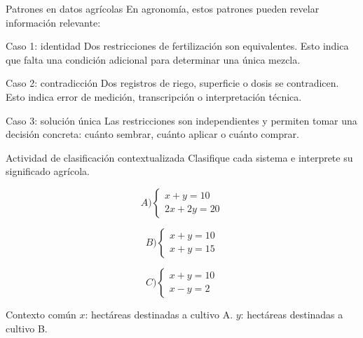 \documentclass[aspectratio=169]{beamer}
\begin{document}
\begin{frame}{Patrones en datos agrícolas}
	\small
	En agronomía, estos patrones pueden revelar información relevante:
	
	\begin{block}{Caso 1: identidad}
		Dos restricciones de fertilización son equivalentes. Esto indica que falta una condición adicional para determinar una única mezcla.
	\end{block}
	
	\begin{block}{Caso 2: contradicción}
		Dos registros de riego, superficie o dosis se contradicen. Esto indica error de medición, transcripción o interpretación técnica.
	\end{block}
	
	\begin{block}{Caso 3: solución única}
		Las restricciones son independientes y permiten tomar una decisión concreta: cuánto sembrar, cuánto aplicar o cuánto comprar.
	\end{block}
\end{frame}
	
\begin{frame}{Actividad de clasificación contextualizada}
	\small
	Clasifique cada sistema e interprete su significado agrícola.
	
	\[
	A)
	\begin{cases}
		x+y=10\\
		2x+2y=20
	\end{cases}
	\]
	
	\[
	B)
	\begin{cases}
		x+y=10\\
		x+y=15
	\end{cases}
	\]
	
	\[
	C)
	\begin{cases}
		x+y=10\\
		x-y=2
	\end{cases}
	\]
	
	\begin{block}{Contexto común}
		\(x\): hectáreas destinadas a cultivo A. \quad \(y\): hectáreas destinadas a cultivo B.
	\end{block}
\end{frame}
	
\end{document}
